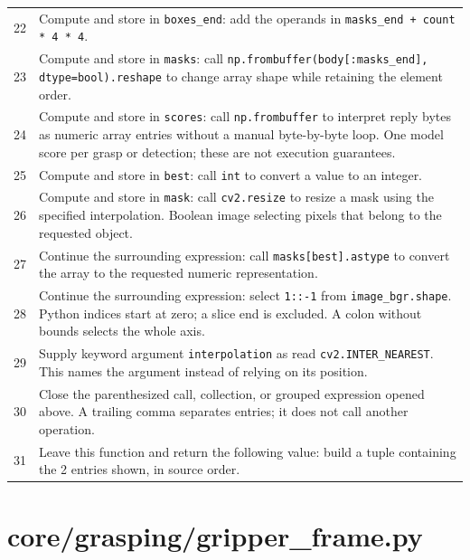 \documentclass[11pt,a4paper]{book}
\begin{document}
\begin{longtable}{r p{}}
22 & Compute and store in \texttt{boxes\_end}: add the operands in \texttt{masks\_end + count * 4 * 4}.  \\

23 & Compute and store in \texttt{masks}: call \texttt{np.frombuffer(body[:masks\_end], dtype=bool).reshape} to change array shape while retaining the element order.  \\

24 & Compute and store in \texttt{scores}: call \texttt{np.frombuffer} to interpret reply bytes as numeric array entries without a manual byte-by-byte loop. One model score per grasp or detection; these are not execution guarantees. \\

25 & Compute and store in \texttt{best}: call \texttt{int} to convert a value to an integer.  \\

26 & Compute and store in \texttt{mask}: call \texttt{cv2.resize} to resize a mask using the specified interpolation. Boolean image selecting pixels that belong to the requested object. \\

27 & Continue the surrounding expression: call \texttt{masks[best].astype} to convert the array to the requested numeric representation. \\

28 & Continue the surrounding expression: select \texttt{1::-1} from \texttt{image\_bgr.shape}. Python indices start at zero; a slice end is excluded. A colon without bounds selects the whole axis. \\

29 & Supply keyword argument \texttt{interpolation} as read \texttt{cv2.INTER\_NEAREST}. This names the argument instead of relying on its position. \\

30 & Close the parenthesized call, collection, or grouped expression opened above. A trailing comma separates entries; it does not call another operation. \\

31 & Leave this function and return the following value: build a tuple containing the 2 entries shown, in source order. \\

\end{longtable}

\chapter{core/grasping/gripper\_frame.py}
\end{document}
